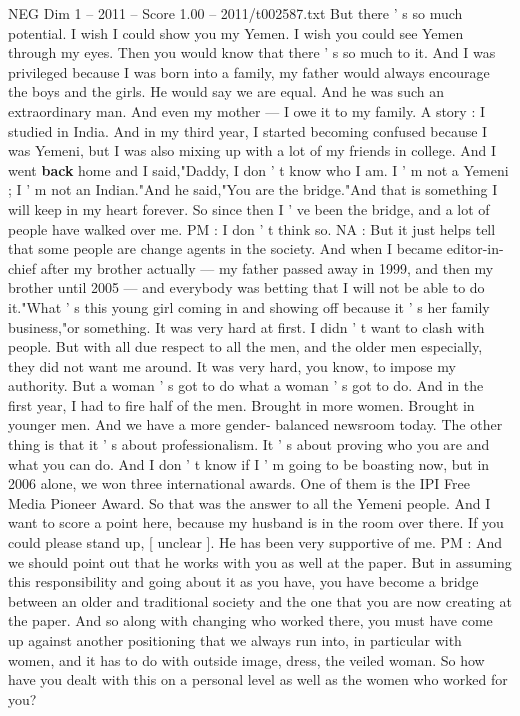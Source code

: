 \begin{textsample}{NEG Dim 1 – 2011 – Score 1.00 – 2011/t002587.txt}
But there ' s so much potential.
I wish I could show you my Yemen.
I wish you could see Yemen through my eyes.
Then you would know that there ' s so much to it.
And I was privileged because I was born into a family, my father would always encourage the boys and the girls.
He would say we are equal.
And he was such an extraordinary man.
And even my mother — I owe it to my family.
A story : I studied in India.
And in my third year, I started becoming confused because I was Yemeni, but I was also mixing up with a lot of my friends in college.
And I went \textbf{back} home and I said,"Daddy, I don ' t know who I am.
I ' m not a Yemeni ; I ' m not an Indian."And he said,"You are the bridge."And that is something I will keep in my heart forever.
So since then I ' ve been the bridge, and a lot of people have walked over me.
PM : I don ' t think so.
NA : But it just helps tell that some people are change agents in the society.
And when I became editor-in-chief after my brother actually — my father passed away in 1999, and then my brother until 2005 — and everybody was betting that I will not be able to do it."What ' s this young girl coming in and showing off because it ' s her family business,"or something.
It was very hard at first.
I didn ' t want to clash with people.
But with all due respect to all the men, and the older men especially, they did not want me around.
It was very hard, you know, to impose my authority.
But a woman ' s got to do what a woman ' s got to do.
And in the first year, I had to fire half of the men.
Brought in more women.
Brought in younger men.
And we have a more gender- balanced newsroom today.
The other thing is that it ' s about professionalism.
It ' s about proving who you are and what you can do.
And I don ' t know if I ' m going to be boasting now, but in 2006 alone, we won three international awards.
One of them is the IPI Free Media Pioneer Award.
So that was the answer to all the Yemeni people.
And I want to score a point here, because my husband is in the room over there.
If you could please stand up, [ unclear ].
He has been very supportive of me.
PM : And we should point out that he works with you as well at the paper.
But in assuming this responsibility and going about it as you have, you have become a bridge between an older and traditional society and the one that you are now creating at the paper.
And so along with changing who worked there, you must have come up against another positioning that we always run into, in particular with women, and it has to do with outside image, dress, the veiled woman.
So how have you dealt with this on a personal level as well as the women who worked for you?

\end{textsample}
